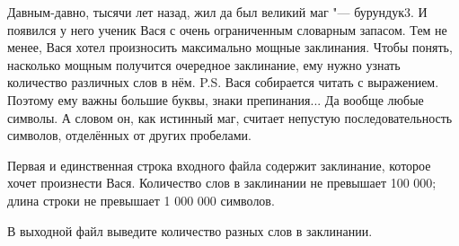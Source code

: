 Давным-давно, тысячи лет назад, жил да был великий маг "--- бурундук3. И появился у него ученик Вася с очень ограниченным словарным запасом. Тем не менее, Вася хотел произносить максимально мощные заклинания. Чтобы понять, насколько мощным получится очередное заклинание, ему нужно узнать количество различных слов в нём.
P.S. Вася собирается читать с выражением. Поэтому ему важны большие буквы, знаки препинания... Да вообще любые символы. А словом он, как истинный маг, считает непустую последовательность символов, отделённых от других пробелами.

\InputFile
Первая и единственная строка входного файла содержит заклинание, которое хочет произнести Вася. Количество слов в заклинании не превышает 100 000; длина строки не превышает 1 000 000 символов.

\OutputFile
В выходной файл выведите количество разных слов в заклинании.